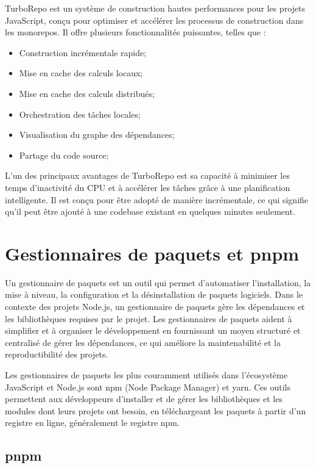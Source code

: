 TurboRepo\cite{Turborepo} est un système de construction hautes performances pour les projets JavaScript, conçu pour optimiser et accélérer les processus de construction dans les monorepos. Il offre plusieurs fonctionnalités puissantes, telles que :

\begin{itemize}
    \item Construction incrémentale rapide;
    \item Mise en cache des calculs locaux;
    \item Mise en cache des calculs distribués;
    \item Orchestration des tâches locales;
    \item Visualisation du graphe des dépendances;
    \item Partage du code source;
\end{itemize}

L'un des principaux avantages de TurboRepo est sa capacité à minimiser les temps d'inactivité du CPU et à accélérer les tâches grâce à une planification intelligente. Il est conçu pour être adopté de manière incrémentale, ce qui signifie qu'il peut être ajouté à une codebase existant en quelques minutes seulement.

\section{Gestionnaires de paquets et pnpm}

Un gestionnaire de paquets est un outil qui permet d'automatiser l'installation, la mise à niveau, la configuration et la désinstallation de paquets logiciels. Dans le contexte des projets Node.js, un gestionnaire de paquets gère les dépendances et les bibliothèques requises par le projet. Les gestionnaires de paquets aident à simplifier et à organiser le développement en fournissant un moyen structuré et centralisé de gérer les dépendances, ce qui améliore la maintenabilité et la reproductibilité des projets.

Les gestionnaires de paquets les plus couramment utilisés dans l'écosystème JavaScript et Node.js sont npm (Node Package Manager) et yarn. Ces outils permettent aux développeurs d'installer et de gérer les bibliothèques et les modules dont leurs projets ont besoin, en téléchargeant les paquets à partir d'un registre en ligne, généralement le registre npm\cite{Npm}.

\subsection{pnpm}

